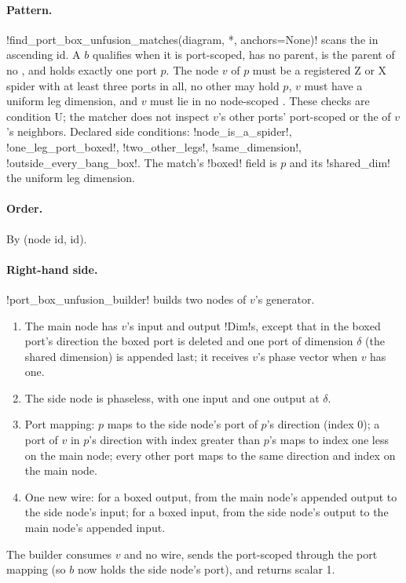 \paragraph{Pattern.} \py!find_port_box_unfusion_matches(diagram, *, anchors=None)! scans the \bboxes{} in ascending id. A \bbox{} $b$ qualifies when it is port-scoped, has no parent, is the parent of no \bbox{}, and holds exactly one port $p$. The node $v$ of $p$ must be a registered Z or X spider with at least three ports in all, no other \bbox{} may hold $p$, $v$ must have a uniform leg dimension, and $v$ must lie in no node-scoped \bbox{}. These checks are condition U; the matcher does not inspect $v$'s other ports' port-scoped \bboxes{} or the \bboxes{} of $v$'s neighbors. Declared side conditions: \code!node_is_a_spider!, \code!one_leg_port_boxed!, \code!two_other_legs!, \code!same_dimension!, \code!outside_every_bang_box!. The match's \py!boxed! field is $p$ and its \py!shared_dim! the uniform leg dimension.

\paragraph{Order.} By (node id, \bbox{} id).

\paragraph{Right-hand side.} \py!port_box_unfusion_builder! builds two nodes of $v$'s generator.
\begin{enumerate}
\item The main node has $v$'s input and output \py!Dim!s, except that in the boxed port's direction the boxed port is deleted and one port of dimension $\delta$ (the shared dimension) is appended last; it receives $v$'s phase vector when $v$ has one.
\item The side node is phaseless, with one input and one output at $\delta$.
\item Port mapping: $p$ maps to the side node's port of $p$'s direction (index 0); a port of $v$ in $p$'s direction with index greater than $p$'s maps to index one less on the main node; every other port maps to the same direction and index on the main node.
\item One new wire: for a boxed output, from the main node's appended output to the side node's input; for a boxed input, from the side node's output to the main node's appended input.
\end{enumerate}
The builder consumes $v$ and no wire, sends the port-scoped \bboxes{} through the port mapping (so $b$ now holds the side node's port), and returns scalar 1.

